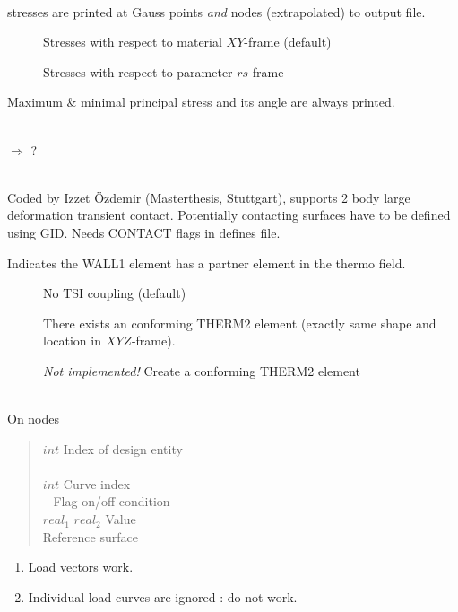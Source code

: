 \\
stresses are printed at Gauss points \emph{and} nodes (extrapolated) to
 output file.
\begin{description}
\item[] Stresses with respect to material $XY$-frame (default)
\item[] Stresses with respect to parameter $rs$-frame
\end{description}
Maximum \& minimal principal stress and its angle are always printed.

\\
$\Longrightarrow$ ?

\\
Coded by Izzet \"Ozdemir (Masterthesis, Stuttgart), supports 2 body large deformation
transient contact. Potentially contacting surfaces have to be defined using GID.
Needs CONTACT flags in defines file.


Indicates the WALL1 element has a partner element in the thermo field. 
\begin{description}
\item[] No TSI coupling (default)
\item[] There exists an conforming THERM2 element
  (exactly same shape and location in $XYZ$-frame).
\item[] \emph{Not implemented!} Create a conforming THERM2 element
\end{description}

\\
On nodes
\begin{quote}
 $int$ \cnl \chs Index of design entity\\
\cod{-} \cnl\\
\cgb {} \cor $int$ \cge \chs Curve index\\
\cgb {} \cor {} \cge \cgb {} \cor {} \cge\  \cnl \chs Flag on/off condition \\
$real_1$ $real_2$  \cnl \chs Value\\
 \chs Reference surface
\end{quote}
\begin{enumerate}
\item Load vectors work.
\item Individual load curves are ignored : do not work.
\end{enumerate}

